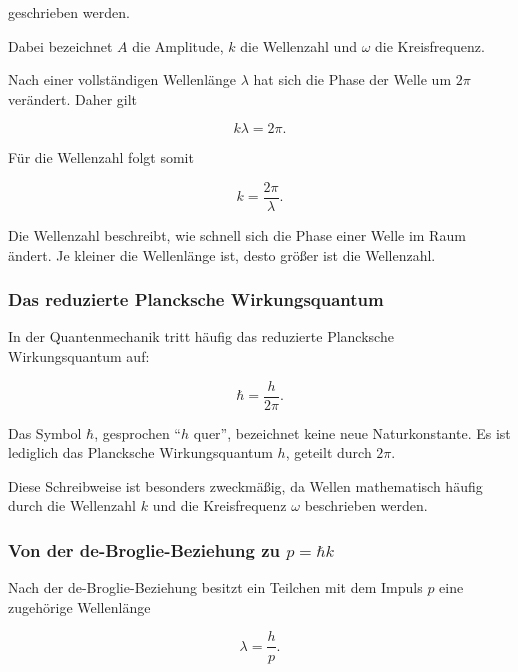 geschrieben werden.

Dabei bezeichnet \(A\) die Amplitude, \(k\) die Wellenzahl und
\(\omega\) die Kreisfrequenz.

Nach einer vollständigen Wellenlänge \(\lambda\) hat sich die Phase der Welle
um \(2\pi\) verändert. Daher gilt

\begin{equation}
	k\lambda
	=
	2\pi.
	\label{eq:app_wellenzahl_definition}
\end{equation}

Für die Wellenzahl folgt somit

\begin{equation}
	k
	=
	\frac{2\pi}{\lambda}.
	\label{eq:app_wellenzahl}
\end{equation}

Die Wellenzahl beschreibt, wie schnell sich die Phase einer Welle im Raum
ändert. Je kleiner die Wellenlänge ist, desto größer ist die Wellenzahl.

\subsubsection*{Das reduzierte Plancksche Wirkungsquantum}

In der Quantenmechanik tritt häufig das reduzierte Plancksche
Wirkungsquantum auf:

\begin{equation}
	\hbar
	=
	\frac{h}{2\pi}.
	\label{eq:app_hquer_definition}
\end{equation}

Das Symbol \(\hbar\), gesprochen \enquote{\(h\) quer}, bezeichnet keine neue
Naturkonstante. Es ist lediglich das Plancksche Wirkungsquantum \(h\),
geteilt durch \(2\pi\).

Diese Schreibweise ist besonders zweckmäßig, da Wellen mathematisch häufig
durch die Wellenzahl \(k\) und die Kreisfrequenz \(\omega\) beschrieben
werden.

\subsubsection*{Von der de-Broglie-Beziehung zu \(p=\hbar k\)}

Nach der de-Broglie-Beziehung besitzt ein Teilchen mit dem Impuls \(p\)
eine zugehörige Wellenlänge

\begin{equation}
	\lambda
	=
	\frac{h}{p}.
	\label{eq:app_de_broglie_voraussetzung}
\end{equation}

